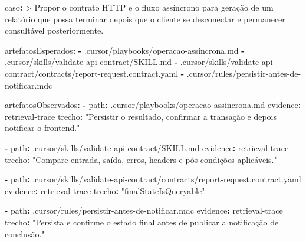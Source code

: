 \documentclass[
  10pt,
  a4paper,
  oneside]{book}
\newenvironment{Shaded}{}{}
\newcommand{\AttributeTok}[1]{\textcolor[rgb]{0.49,0.56,0.16}{#1}}
\newcommand{\CharTok}[1]{\textcolor[rgb]{0.25,0.44,0.63}{#1}}
\newcommand{\FunctionTok}[1]{\textcolor[rgb]{0.02,0.16,0.49}{#1}}
\newcommand{\KeywordTok}[1]{\textcolor[rgb]{0.00,0.44,0.13}{\textbf{#1}}}
\newcommand{\NormalTok}[1]{#1}
\newcommand{\StringTok}[1]{\textcolor[rgb]{0.25,0.44,0.63}{#1}}
\renewenvironment{Shaded}{\begin{snugshade}}{\end{snugshade}}%
\begin{document}
\begin{Shaded}
\begin{Highlighting}[]
\FunctionTok{caso}\KeywordTok{: }\CharTok{\textgreater{}}
\NormalTok{  Propor o contrato HTTP e o fluxo assíncrono para geração de um relatório}
\NormalTok{  que possa terminar depois que o cliente se desconectar e permanecer}
\NormalTok{  consultável posteriormente.}

\FunctionTok{artefatosEsperados}\KeywordTok{:}
\AttributeTok{  }\KeywordTok{{-}}\AttributeTok{ .cursor/playbooks/operacao{-}assincrona.md}
\AttributeTok{  }\KeywordTok{{-}}\AttributeTok{ .cursor/skills/validate{-}api{-}contract/SKILL.md}
\AttributeTok{  }\KeywordTok{{-}}\AttributeTok{ .cursor/skills/validate{-}api{-}contract/contracts/report{-}request.contract.yaml}
\AttributeTok{  }\KeywordTok{{-}}\AttributeTok{ .cursor/rules/persistir{-}antes{-}de{-}notificar.mdc}

\FunctionTok{artefatosObservados}\KeywordTok{:}
\AttributeTok{  }\KeywordTok{{-}}\AttributeTok{ }\FunctionTok{path}\KeywordTok{:}\AttributeTok{ .cursor/playbooks/operacao{-}assincrona.md}
\AttributeTok{    }\FunctionTok{evidence}\KeywordTok{:}\AttributeTok{ retrieval{-}trace}
\AttributeTok{    }\FunctionTok{trecho}\KeywordTok{:}\AttributeTok{ }\StringTok{"Persistir o resultado, confirmar a transação e depois notificar o frontend."}

\AttributeTok{  }\KeywordTok{{-}}\AttributeTok{ }\FunctionTok{path}\KeywordTok{:}\AttributeTok{ .cursor/skills/validate{-}api{-}contract/SKILL.md}
\AttributeTok{    }\FunctionTok{evidence}\KeywordTok{:}\AttributeTok{ retrieval{-}trace}
\AttributeTok{    }\FunctionTok{trecho}\KeywordTok{:}\AttributeTok{ }\StringTok{"Compare entrada, saída, erros, headers e pós{-}condições aplicáveis."}

\AttributeTok{  }\KeywordTok{{-}}\AttributeTok{ }\FunctionTok{path}\KeywordTok{:}\AttributeTok{ .cursor/skills/validate{-}api{-}contract/contracts/report{-}request.contract.yaml}
\AttributeTok{    }\FunctionTok{evidence}\KeywordTok{:}\AttributeTok{ retrieval{-}trace}
\AttributeTok{    }\FunctionTok{trecho}\KeywordTok{:}\AttributeTok{ }\StringTok{"finalStateIsQueryable"}

\AttributeTok{  }\KeywordTok{{-}}\AttributeTok{ }\FunctionTok{path}\KeywordTok{:}\AttributeTok{ .cursor/rules/persistir{-}antes{-}de{-}notificar.mdc}
\AttributeTok{    }\FunctionTok{evidence}\KeywordTok{:}\AttributeTok{ retrieval{-}trace}
\AttributeTok{    }\FunctionTok{trecho}\KeywordTok{:}\AttributeTok{ }\StringTok{"Persista e confirme o estado final antes de publicar a notificação de conclusão."}


\end{Highlighting}
\end{Shaded}
\end{document}
